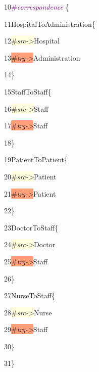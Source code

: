 {


10\hspace{0.5cm}\textcolor{Purple}{\#\textit{correspondence}} \{

11\hspace{1cm}HospitalToAdministration\{

12\hspace{1.5cm}\colorbox{LightYellow}{\#\textit{src->}}Hospital

13\hspace{1.5cm}\colorbox{LightSalmon}{\#\textit{trg->}}Administration

14\hspace{1cm}\}

15\hspace{1cm}StaffToStaff\{
	
16\hspace{1.5cm}\colorbox{LightYellow}{\#\textit{src->}}Staff

17\hspace{1.5cm}\colorbox{LightSalmon}{\#\textit{trg->}}Staff

18\hspace{1cm}\}

19\hspace{1cm}PatientToPatient\{

20\hspace{1.5cm}\colorbox{LightYellow}{\#\textit{src->}}Patient

21\hspace{1.5cm}\colorbox{LightSalmon}{\#\textit{trg->}}Patient

22\hspace{1cm}\}

23\hspace{1cm}DoctorToStaff\{

24\hspace{1.5cm}\colorbox{LightYellow}{\#\textit{src->}}Doctor

25\hspace{1.5cm}\colorbox{LightSalmon}{\#\textit{trg->}}Staff

26\hspace{1cm}\}

27\hspace{1cm}NurseToStaff\{

28\hspace{1.5cm}\colorbox{LightYellow}{\#\textit{src->}}Nurse

29\hspace{1.5cm}\colorbox{LightSalmon}{\#\textit{trg->}}Staff

30\hspace{1cm}\}

31\hspace{0.5cm}\}

}


